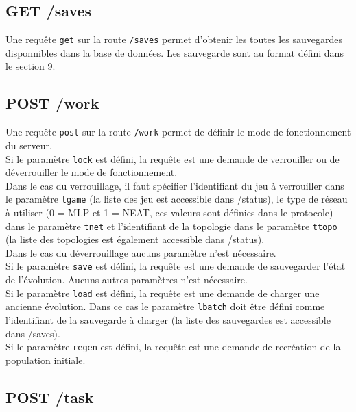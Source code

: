 \documentclass{article}
\begin{document}
\subsection{GET /saves}

Une requête \texttt{get} sur la route \texttt{/saves} permet d'obtenir les toutes les sauvegardes disponnibles dans la base de données. Les sauvegarde sont au format défini dans le section 9.\\

\subsection{POST /work}
Une requête \texttt{post} sur la route \texttt{/work} permet de définir le mode de fonctionnement du serveur.\\

Si le paramètre \texttt{lock} est défini, la requête est une demande de verrouiller ou de déverrouiller le mode de fonctionnement.\\

Dans le cas du verrouillage, il faut spécifier l'identifiant du jeu à verrouiller dans le paramètre \texttt{tgame} (la liste des jeu est accessible dans /status), le type de réseau à utiliser (0 = MLP et 1 = NEAT, ces valeurs sont définies dans le protocole) dans le paramètre \texttt{tnet} et l'identifiant de la topologie dans le paramètre \texttt{ttopo} (la liste des topologies est également accessible dans /status).\\

Dans le cas du déverrouillage aucuns paramètre n'est nécessaire.\\

Si le paramètre \texttt{save} est défini, la requête est une demande de sauvegarder l'état de l'évolution. Aucuns autres paramètres n'est nécessaire.\\

Si le paramètre \texttt{load} est défini, la requête est une demande de charger une ancienne évolution. Dans ce cas le paramètre \texttt{lbatch} doit être défini comme l'identifiant de la sauvegarde à charger (la liste des sauvegardes est accessible dans /saves).\\

Si le paramètre \texttt{regen} est défini, la requête est une demande de recréation de la population initiale.

\subsection{POST /task}
\end{document}
